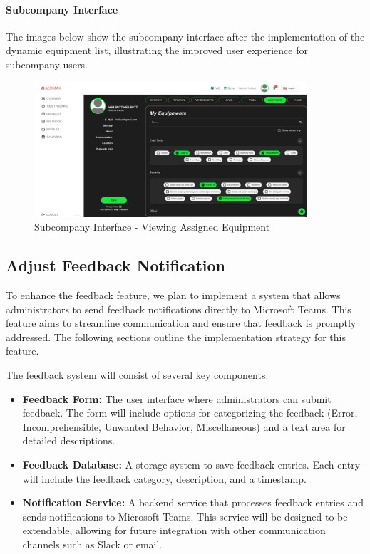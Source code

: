 \paragraph{Subcompany Interface}
The images below show the subcompany interface after the implementation of the dynamic equipment list, illustrating the improved user experience for subcompany users.

\begin{figure}[H]
\centering
\includegraphics[width=0.9\textwidth]{src/assets/images/Interface1.png}
\caption{Subcompany Interface - Viewing Assigned Equipment}
\label{fig:subcompany_interface_1}
\end{figure}

\subsection{Adjust Feedback Notification}
To enhance the feedback feature, we plan to implement a system that allows administrators to send feedback notifications directly to Microsoft Teams. This feature aims to streamline communication and ensure that feedback is promptly addressed. The following sections outline the implementation strategy for this feature.

The feedback system will consist of several key components:

\begin{itemize}
    \item \textbf{Feedback Form:} The user interface where administrators can submit feedback. The form will include options for categorizing the feedback (Error, Incomprehensible, Unwanted Behavior, Miscellaneous) and a text area for detailed descriptions.
    \item \textbf{Feedback Database:} A storage system to save feedback entries. Each entry will include the feedback category, description, and a timestamp.
    \item \textbf{Notification Service:} A backend service that processes feedback entries and sends notifications to Microsoft Teams. This service will be designed to be extendable, allowing for future integration with other communication channels such as Slack or email.
\end{itemize}

